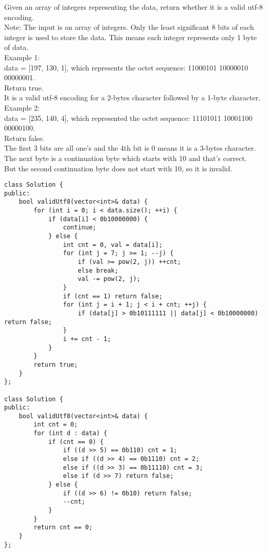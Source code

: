 Given an array of integers representing the data, return whether it is a valid utf-8 encoding.\\

Note:
The input is an array of integers. Only the least significant 8 bits of each integer is used to store the data. This means each integer represents only 1 byte of data.\\

Example 1:\\
data = [197, 130, 1], which represents the octet sequence: 11000101 10000010 00000001.\\
Return true.\\
It is a valid utf-8 encoding for a 2-bytes character followed by a 1-byte character.\\

Example 2:\\
data = [235, 140, 4], which represented the octet sequence: 11101011 10001100 00000100.\\
Return false.\\
The first 3 bits are all one's and the 4th bit is 0 means it is a 3-bytes character.\\
The next byte is a continuation byte which starts with 10 and that's correct.\\
But the second continuation byte does not start with 10, so it is invalid.\\

\begin{lstlisting}
class Solution {
public:
    bool validUtf8(vector<int>& data) {
        for (int i = 0; i < data.size(); ++i) {
            if (data[i] < 0b10000000) {
                continue;
            } else {
                int cnt = 0, val = data[i];
                for (int j = 7; j >= 1; --j) {
                    if (val >= pow(2, j)) ++cnt;
                    else break;
                    val -= pow(2, j);
                }
                if (cnt == 1) return false;
                for (int j = i + 1; j < i + cnt; ++j) {
                    if (data[j] > 0b10111111 || data[j] < 0b10000000) return false;
                } 
                i += cnt - 1;
            }
        }
        return true;
    }
};

class Solution {
public:
    bool validUtf8(vector<int>& data) {
        int cnt = 0;
        for (int d : data) {
            if (cnt == 0) {
                if ((d >> 5) == 0b110) cnt = 1;
                else if ((d >> 4) == 0b1110) cnt = 2;
                else if ((d >> 3) == 0b11110) cnt = 3;
                else if (d >> 7) return false;
            } else {
                if ((d >> 6) != 0b10) return false;
                --cnt;
            }
        }
        return cnt == 0;
    }
};
\end{lstlisting}


